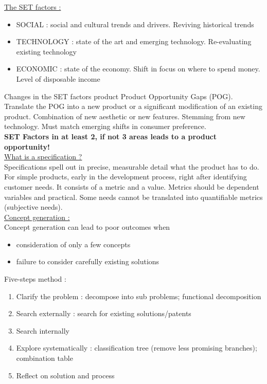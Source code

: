 \documentclass[../main.tex]{subfiles}
\begin{document}
\quad \underline{The SET factors :}\\
\begin{itemize}
    \item SOCIAL : social and cultural trends and drivers. Reviving historical trends\\
    \item TECHNOLOGY : state of the art and emerging technology. Re-evaluating existing technology\\
    \item ECONOMIC : state of the economy. Shift in focus on where to spend money. Level of disposable income\\
\end{itemize}

Changes in the SET factors product Product Opportunity Gaps (POG). Translate the POG into a new product or a significant modification of an existing product. Combination of new aesthetic or new features. Stemming from new technology. Must match emerging shifts in consumer preference.\\

\textbf{SET Factors in at least 2, if not 3 areas leads to a product opportunity!}\\

\quad \underline{What is a specification ?}\\
Specifications spell out in precise, measurable detail what the product has to do. For simple products, early in the development process, right after identifying customer needs. It consists of a metric and a value. Metrics should be dependent variables and practical. Some needs cannot be translated into quantifiable metrics (subjective needs).\\

\quad \underline{Concept generation :}\\
Concept generation can lead to poor outcomes when \begin{itemize}
    \item consideration of only a few concepts\\
    \item failure to consider  carefully existing solutions\\
\end{itemize}

Five-steps method : \begin{enumerate}
    \item Clarify the problem : decompose into sub problems; functional decomposition\\
    \item Search externally : search for existing solutions/patents\\
    \item Search internally\\
    \item Explore systematically : classification tree (remove less promising branches); combination table\\
    \item Reflect on solution and process\\
\end{enumerate}
\end{document}
